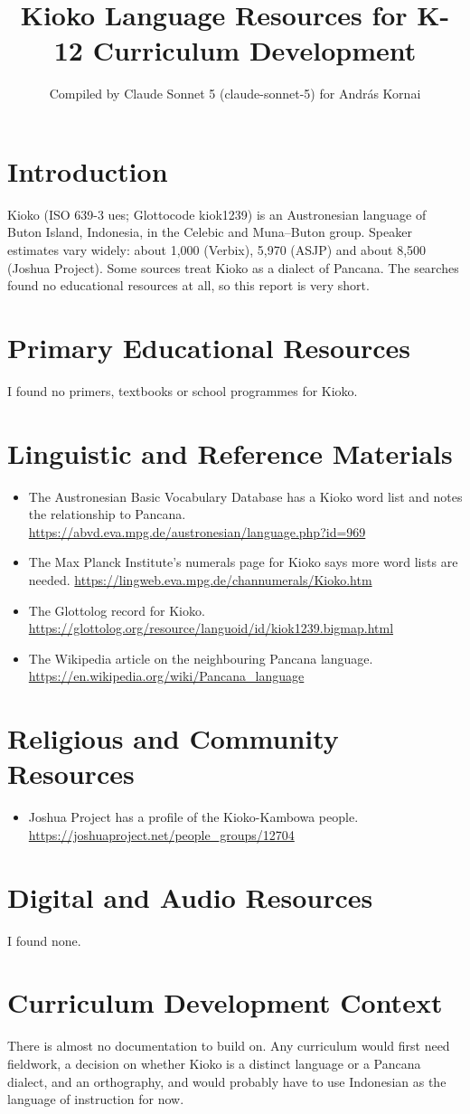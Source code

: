 \documentclass[12pt]{article}
\title{Kioko Language Resources for K-12 Curriculum Development}
\author{Compiled by Claude Sonnet 5 (claude-sonnet-5) for Andr\'as Kornai}
\date{}
\begin{document}
\maketitle

\section{Introduction}
Kioko (ISO 639-3 ues; Glottocode kiok1239) is an Austronesian language of Buton Island, Indonesia, in the Celebic and Muna--Buton group. Speaker estimates vary widely: about 1,000 (Verbix), 5,970 (ASJP) and about 8,500 (Joshua Project). Some sources treat Kioko as a dialect of Pancana. The searches found no educational resources at all, so this report is very short.

\section{Primary Educational Resources}
I found no primers, textbooks or school programmes for Kioko.

\section{Linguistic and Reference Materials}
\begin{itemize}
\item The Austronesian Basic Vocabulary Database has a Kioko word list and notes the relationship to Pancana. \url{https://abvd.eva.mpg.de/austronesian/language.php?id=969}
\item The Max Planck Institute's numerals page for Kioko says more word lists are needed. \url{https://lingweb.eva.mpg.de/channumerals/Kioko.htm}
\item The Glottolog record for Kioko. \url{https://glottolog.org/resource/languoid/id/kiok1239.bigmap.html}
\item The Wikipedia article on the neighbouring Pancana language. \url{https://en.wikipedia.org/wiki/Pancana_language}
\end{itemize}

\section{Religious and Community Resources}
\begin{itemize}
\item Joshua Project has a profile of the Kioko-Kambowa people. \url{https://joshuaproject.net/people_groups/12704}
\end{itemize}

\section{Digital and Audio Resources}
I found none.

\section{Curriculum Development Context}
There is almost no documentation to build on. Any curriculum would first need fieldwork, a decision on whether Kioko is a distinct language or a Pancana dialect, and an orthography, and would probably have to use Indonesian as the language of instruction for now.
\end{document}
